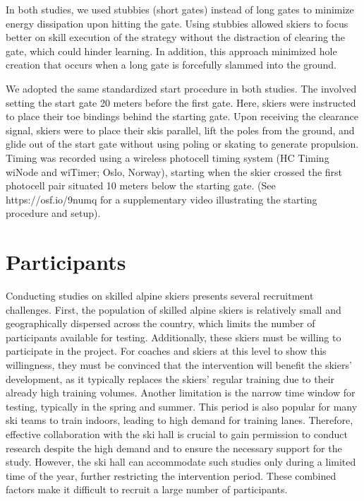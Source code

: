In both studies, we used stubbies (short gates) instead of long gates to minimize energy dissipation upon hitting the gate\cite{minetti_biomechanics_2018}. Using stubbies allowed skiers to focus better on skill execution of the strategy without the distraction of clearing the gate, which could hinder learning. In addition, this approach minimized hole creation that occurs when a long gate is forcefully slammed into the ground. 

We adopted the same standardized start procedure in both studies. The involved setting the start gate 20 meters before the first gate. Here, skiers were instructed to place their toe bindings behind the starting gate. Upon receiving the clearance signal, skiers were to place their skis parallel, lift the poles from the ground, and glide out of the start gate without using poling or skating to generate propulsion. Timing was recorded using a wireless photocell timing system (HC Timing wiNode and wiTimer; Oslo, Norway), starting when the skier crossed the first photocell pair situated 10 meters below the starting gate. (See https://osf.io/9numq for a supplementary video illustrating the starting procedure and setup).


\section{Participants}
Conducting studies on skilled alpine skiers presents several recruitment challenges. First, the population of skilled alpine skiers is relatively small and geographically dispersed across the country, which limits the number of participants available for testing. Additionally, these skiers must be willing to participate in the project. For coaches and skiers at this level to show this willingness, they must be convinced that the intervention will benefit the skiers' development, as it typically replaces the skiers' regular training due to their already high training volumes. Another limitation is the narrow time window for testing, typically in the spring and summer. This period is also popular for many ski teams to train indoors, leading to high demand for training lanes. Therefore, effective collaboration with the ski hall is crucial to gain permission to conduct research despite the high demand and to ensure the necessary support for the study. However, the ski hall can accommodate such studies only during a limited time of the year, further restricting the intervention period. These combined factors make it difficult to recruit a large number of participants.

